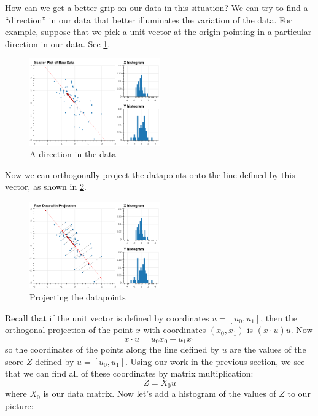 \documentclass[
]{article}
\begin{document}
How can we get a better grip on our data in this situation? We can try
to find a ``direction'' in our data that better illuminates the
variation of the data. For example, suppose that we pick a unit vector
at the origin pointing in a particular direction in our data. See
\cref{fig:pcasimfig-1}.

\begin{figure}
\hypertarget{fig:pcasimfig-1}{%
\centering
\includegraphics[width=0.5\textwidth,height=\textheight]{../img/PCAsimulated-2.png}
\caption{A direction in the data}\label{fig:pcasimfig-1}
}
\end{figure}

Now we can orthogonally project the datapoints onto the line defined by
this vector, as shown in \cref{fig:pcasimfig-2}.

\begin{figure}
\hypertarget{fig:pcasimfig-2}{%
\centering
\includegraphics[width=0.5\textwidth,height=\textheight]{../img/PCAsimulated-3.png}
\caption{Projecting the datapoints}\label{fig:pcasimfig-2}
}
\end{figure}

Recall that if the unit vector is defined by coordinates
\(u=[u_0,u_1]\), then the orthogonal projection of the point \(x\) with
coordinates \((x_0,x_1)\) is \((x\cdot u)u\). Now \[
x\cdot u = u_0 x_0 + u_1 x_1
\] so the coordinates of the points along the line defined by \(u\) are
the values of the score \(Z\) defined by \(u=[u_0,u_1]\). Using our work
in the previous section, we see that we can find all of these
coordinates by matrix multiplication: \[
Z = X_0 u
\] where \(X_0\) is our data matrix. Now let's add a histogram of the
values of \(Z\) to our picture:
\end{document}
